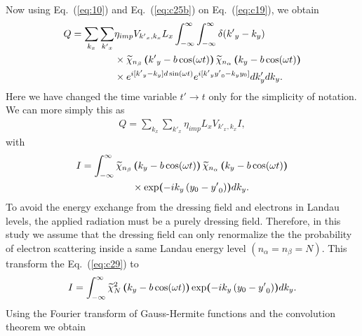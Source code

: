 \documentclass[
 reprint,
 amsmath,amssymb,
 aps,
 prb,
]{revtex4-2}
\begin{document}
\begin{appendix}
Now using Eq.~(\ref{eq:10}) and Eq.~(\ref{eq:c25b}) on Eq.~(\ref{eq:c19}), we obtain
\begin{equation} \label{eq:c27}
  \begin{aligned}
    Q  =
    \sum_{k_x}\sum_{{k'}_x} &
    {\eta_{imp} V_{{k'}_x,k_x}} L_x
    \int_{-\infty}^{\infty} \int_{-\infty}^{\infty}
    \delta({k'}_y - k_y)
    \\
    & \times
    \widetilde{\chi}_{n_{\beta}} \bm{\left(} {k'}_y -b\cos(\omega t) \bm{\right)}
    \widetilde{\chi}_{n_{\alpha}}  \bm{\left(}k_y -b\cos(\omega t) \bm{\right)}
    \\
    & \times
    e^{i[{k'}_y - k_y]d\sin(\omega t)}
    e^{i[{k'}_y {y'}_0 - k_y y_0]}
     dk'_y dk_y.
  \end{aligned}
\end{equation}
Here we have changed the time variable $t' \rightarrow t$ only for the simplicity of notation. We can more simply this as
\begin{equation} \label{eq:c28}
  \begin{aligned}
    Q =
    \sum_{k_x}\sum_{{k'}_x} \eta_{imp} L_x V_{{k'}_x,k_x} I,
  \end{aligned}
\end{equation}
with
\begin{equation} \label{eq:c29}
  \begin{aligned}
    I =
    \int_{-\infty}^{\infty}
    \widetilde{\chi}_{n_{\beta}} &\bm{\left(}  k_y -b\cos(\omega t) \bm{\right)}
    \widetilde{\chi}_{n_{\alpha}} \bm{\left(} k_y -b\cos(\omega t) \bm{\right)} \\
    & \times
    \exp \bm{(}
      -ik_y  \left(y_0 - {y'}_0 \right)
    \bm{)} dk_y.
  \end{aligned}
\end{equation}
To avoid the energy exchange from the dressing field and electrons in Landau levels, the applied radiation must be a purely dressing field.
Therefore, in this study we assume that the dressing field can only renormalize the the probability of electron scattering inside a same Landau energy level $(n_{\alpha} = n_{\beta} =N)$. This transform the Eq.~(\ref{eq:c29}) to
\begin{equation} \label{eq:c30}
    I =
    \int_{-\infty}^{\infty}
    \widetilde{\chi}_N^2 \bm{\left(}  k_y -b\cos(\omega t) \bm{\right)}
    \exp \bm{(}
      -ik_y  \left(y_0 - {y'}_0 \right)
    \bm{)} dk_y.
\end{equation}
Using the Fourier transform of Gauss-Hermite functions \cite{celeghini21} and the convolution theorem \cite{arfken85,bracewell78} we obtain

\end{appendix}
\end{document}

